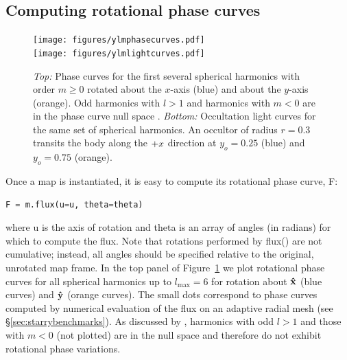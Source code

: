 \documentclass[modern]{aastex61}
\begin{document}
\subsection{Computing rotational phase curves}
\label{sec:starryphasecurves}
%
\begin{figure}[p!]
    \begin{centering}
    \texttt{[image: figures/ylmphasecurves.pdf]}
    \\[1em]
    \texttt{[image: figures/ylmlightcurves.pdf]}
    \caption{\label{fig:ylmlightcurves}
             \emph{Top:} Phase curves for the first several spherical
             harmonics with order $m \ge 0$ rotated about the $x$-axis
             (blue) and about the $y$-axis (orange).
             Odd harmonics with $l > 1$ and harmonics with $m < 0$ are
             in the phase curve null space \citep{CowanFuentesHaggard2013}.
             \emph{Bottom:} Occultation light curves for the same
             set of spherical harmonics. An occultor of radius $r=0.3$
             transits the body along the $+\mbox{$x$}$ direction at $y_o = 0.25$
             (blue) and $y_o = 0.75$ (orange). }
    \end{centering}
\end{figure}
%
Once a map is instantiated, it is easy to compute its rotational
phase curve, \textsf{F}:
%
\begin{lstlisting}[language=Python,firstnumber=last]
F = m.flux(u=u, theta=theta)
\end{lstlisting}
%
where \textsf{u} is the axis of rotation and \textsf{theta} is an array of
angles (in radians) for which to compute the flux. Note that rotations performed
by \textsf{flux()} are not cumulative; instead, all angles should be specified
relative to the original, unrotated map frame.
%
In the top panel of Figure~\ref{fig:ylmlightcurves} we plot rotational phase curves
for all spherical harmonics
up to $l_\mathrm{max} = 6$ for rotation about $\mathbf{\hat{x}}$ (blue curves) and $\mathbf{\hat{y}}$
(orange curves). The small dots correspond to phase curves computed by numerical
evaluation of the flux on an adaptive radial mesh (see \S\ref{sec:starrybenchmarks}).
As discussed by \citet{CowanFuentesHaggard2013}, harmonics with
odd $l > 1$ and those with $m < 0$ (not plotted) are in the null space and
therefore do not exhibit rotational phase variations.

%
\end{document}
